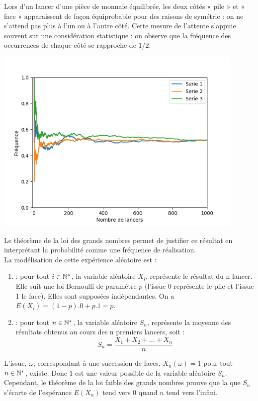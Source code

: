 \documentclass{book}
\begin{document}
Lors d'un lancer d'une pièce de monnaie équilibrée, les deux côtés « pile » et « face » apparaissent de façon équiprobable pour des raisons de symétrie : on ne s'attend pas plus à l'un ou à l'autre côté. Cette mesure de l'attente s'appuie souvent sur une considération statistique : on observe que la fréquence des occurrences de chaque côté se rapproche de 1/2. 
\begin{center}
\includegraphics[width=12cm]{frequence_lancer.png}
\end{center}
Le théorème de la loi des grands nombres permet de justifier ce résultat en interprétant la probabilité comme une fréquence de réalisation.\\
La modélisation de cette expérience aléatoire est :
\begin{enumerate}
\item  {} :  pour tout $i\in\mathbb{N}^*$,  la variable aléatoire $X_i$, représente le résultat du n lancer. Elle  suit une loi Bernoulli de paramètre $p$ (l'issue 0 représente le pile et l'issue 1 le face). Elles sont supposées indépendantes.  On a $E(X_i) = (1 - p).0 + p.1  = p.$ 
\item {} : pour tout $n\in\mathbb{N}^*$,  la variable aléatoire $S_n$, représente la moyenne des résultats obtenus au cours des n premiers lancers, soit :
$$ S_n =\frac{X_1+X_2+\dots+X_n}{n}$$ 
\end{enumerate}
L'issue, $\omega$, correspondant à une succession de faces, $X_n(\omega)=1$ pour tout $n\in \mathbb{N}^*$, existe. Donc $1$ est une valeur possible de la variable aléatoire $S_n$. Cependant, le théorème de la loi faible des grands nombres prouve que la  que $S_n$ s'écarte de l'espérance $E(X_n)$ tend vers 0 quand $n$ tend vers l'infini. 
\end{document}
